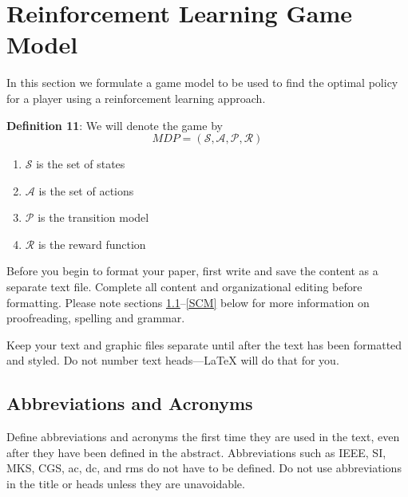 \documentclass[conference]{IEEEtran}
\begin{document}
\section{Reinforcement Learning Game Model}
In this section we formulate a game model to be used to find the optimal policy for a player using a reinforcement learning approach.

\textbf{Definition 11}: We will denote the game by $$MDP = (\mathcal{S}, \mathcal{A}, \mathcal{P}, \mathcal{R})$$
\begin{enumerate}
\item $\mathcal{S}$ is the set of states
\item $\mathcal{A}$ is the set of actions
\item $\mathcal{P}$ is the transition model
\item $\mathcal{R}$ is the reward function

\end{enumerate}

Before you begin to format your paper, first write and save the content as a 
separate text file. Complete all content and organizational editing before 
formatting. Please note sections \ref{AA}--\ref{SCM} below for more information on 
proofreading, spelling and grammar.

Keep your text and graphic files separate until after the text has been 
formatted and styled. Do not number text heads---{\LaTeX} will do that 
for you.

\subsection{Abbreviations and Acronyms}\label{AA}
Define abbreviations and acronyms the first time they are used in the text, 
even after they have been defined in the abstract. Abbreviations such as 
IEEE, SI, MKS, CGS, ac, dc, and rms do not have to be defined. Do not use 
abbreviations in the title or heads unless they are unavoidable.
\end{document}
